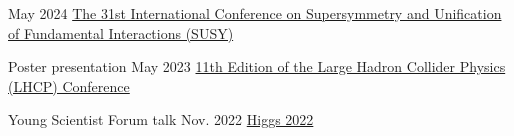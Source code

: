 
\begin{cventries}
    {}
    {May 2024}
    {\href{https://indico.cern.ch/event/1354279/contributions/5942297/}{The 31st International Conference on Supersymmetry and Unification of Fundamental Interactions (SUSY)}}
    {}\vspace*{2mm}

    
    {Poster presentation}
    {May 2023}
    {\href{https://indico.cern.ch/event/1198609/contributions/5340462/}{11th Edition of the Large Hadron Collider Physics (LHCP) Conference}}
    {}\vspace*{2mm}
    
    {Young Scientist Forum talk}
    {Nov. 2022}
    {\href{https://indico.cern.ch/event/1086716/contributions/5049260/}{Higgs 2022}}
    {}\vspace*{2mm}




\end{cventries}
